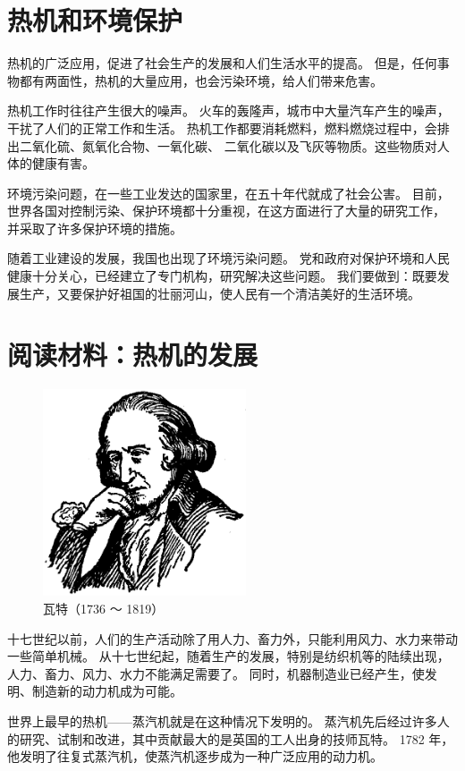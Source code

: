 \section{热机和环境保护}\label{sec:6-4}

热机的广泛应用，促进了社会生产的发展和人们生活水平的提高。
但是，任何事物都有两面性，热机的大量应用，也会污染环境，给人们带来危害。

热机工作时往往产生很大的噪声。
火车的轰隆声，城市中大量汽车产生的噪声，干扰了人们的正常工作和生活。
热机工作都要消耗燃料，燃料燃烧过程中，会排出二氧化硫、氮氧化合物、一氧化碳、
二氧化碳以及飞灰等物质。这些物质对人体的健康有害。

环境污染问题，在一些工业发达的国家里，在五十年代就成了社会公害。
目前，世界各国对控制污染、保护环境都十分重视，在这方面进行了大量的研究工作，
并采取了许多保护环境的措施。

随着工业建设的发展，我国也出现了环境污染问题。
党和政府对保护环境和人民健康十分关心，已经建立了专门机构，研究解决这些问题。
我们要做到：既要发展生产，又要保护好祖国的壮丽河山，使人民有一个清洁美好的生活环境。




\section*{阅读材料：热机的发展}

\begin{figure}
    \centering
    \includegraphics[width=6cm]{../pic/czwl2-ch6-watt}
    \caption*{瓦特（1736 ～ 1819）}\label{fig:6-watt}
\end{figure}

十七世纪以前，人们的生产活动除了用人力、畜力外，只能利用风力、水力来带动一些简单机械。
从十七世纪起，随着生产的发展，特别是纺织机等的陆续出现，人力、畜力、风力、水力不能满足需要了。
同时，机器制造业已经产生，使发明、制造新的动力机成为可能。

世界上最早的热机——蒸汽机就是在这种情况下发明的。
蒸汽机先后经过许多人的研究、试制和改进，其中贡献最大的是英国的工人出身的技师瓦特。
1782 年，他发明了往复式蒸汽机，使蒸汽机逐步成为一种广泛应用的动力机。

